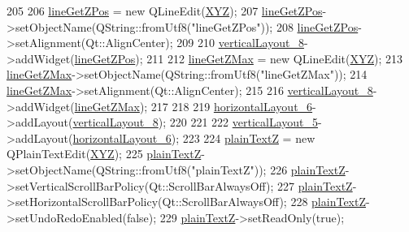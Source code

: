 \begin{DoxyCode}
205 
206         \hyperlink{class_ui___e3_p_j_r_af271cd40f5223cbdb1803e41493746cc}{lineGetZPos} = \textcolor{keyword}{new} QLineEdit(\hyperlink{class_ui___e3_p_j_r_a098a80b873d9e0a09fd834f09e5028b4}{XYZ});
207         \hyperlink{class_ui___e3_p_j_r_af271cd40f5223cbdb1803e41493746cc}{lineGetZPos}->setObjectName(QString::fromUtf8(\textcolor{stringliteral}{"lineGetZPos"}));
208         \hyperlink{class_ui___e3_p_j_r_af271cd40f5223cbdb1803e41493746cc}{lineGetZPos}->setAlignment(Qt::AlignCenter);
209 
210         \hyperlink{class_ui___e3_p_j_r_aecbd2cafbe12abcd4a5a7865aad8d917}{verticalLayout\_8}->addWidget(\hyperlink{class_ui___e3_p_j_r_af271cd40f5223cbdb1803e41493746cc}{lineGetZPos});
211 
212         \hyperlink{class_ui___e3_p_j_r_a4bd5e082a2fb51522d5606ed355289d5}{lineGetZMax} = \textcolor{keyword}{new} QLineEdit(\hyperlink{class_ui___e3_p_j_r_a098a80b873d9e0a09fd834f09e5028b4}{XYZ});
213         \hyperlink{class_ui___e3_p_j_r_a4bd5e082a2fb51522d5606ed355289d5}{lineGetZMax}->setObjectName(QString::fromUtf8(\textcolor{stringliteral}{"lineGetZMax"}));
214         \hyperlink{class_ui___e3_p_j_r_a4bd5e082a2fb51522d5606ed355289d5}{lineGetZMax}->setAlignment(Qt::AlignCenter);
215 
216         \hyperlink{class_ui___e3_p_j_r_aecbd2cafbe12abcd4a5a7865aad8d917}{verticalLayout\_8}->addWidget(\hyperlink{class_ui___e3_p_j_r_a4bd5e082a2fb51522d5606ed355289d5}{lineGetZMax});
217 
218 
219         \hyperlink{class_ui___e3_p_j_r_aee7bbbb4f14e80e5c3821623d9c4d52b}{horizontalLayout\_6}->addLayout(\hyperlink{class_ui___e3_p_j_r_aecbd2cafbe12abcd4a5a7865aad8d917}{verticalLayout\_8});
220 
221 
222         \hyperlink{class_ui___e3_p_j_r_acbe0600e63ca9c63fe807730289e677a}{verticalLayout\_5}->addLayout(\hyperlink{class_ui___e3_p_j_r_aee7bbbb4f14e80e5c3821623d9c4d52b}{horizontalLayout\_6});
223 
224         \hyperlink{class_ui___e3_p_j_r_aa688da4507156fb25ab31678d45842c9}{plainTextZ} = \textcolor{keyword}{new} QPlainTextEdit(\hyperlink{class_ui___e3_p_j_r_a098a80b873d9e0a09fd834f09e5028b4}{XYZ});
225         \hyperlink{class_ui___e3_p_j_r_aa688da4507156fb25ab31678d45842c9}{plainTextZ}->setObjectName(QString::fromUtf8(\textcolor{stringliteral}{"plainTextZ"}));
226         \hyperlink{class_ui___e3_p_j_r_aa688da4507156fb25ab31678d45842c9}{plainTextZ}->setVerticalScrollBarPolicy(Qt::ScrollBarAlwaysOff);
227         \hyperlink{class_ui___e3_p_j_r_aa688da4507156fb25ab31678d45842c9}{plainTextZ}->setHorizontalScrollBarPolicy(Qt::ScrollBarAlwaysOff);
228         \hyperlink{class_ui___e3_p_j_r_aa688da4507156fb25ab31678d45842c9}{plainTextZ}->setUndoRedoEnabled(\textcolor{keyword}{false});
229         \hyperlink{class_ui___e3_p_j_r_aa688da4507156fb25ab31678d45842c9}{plainTextZ}->setReadOnly(\textcolor{keyword}{true});

\end{DoxyCode}

